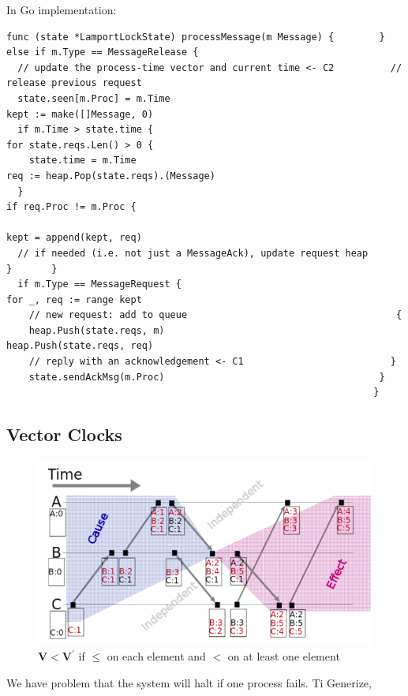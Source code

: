 \documentclass[acmlarge]{acmart}
\begin{document}
In Go implementation:

\begin{lstlisting}
func (state *LamportLockState) processMessage(m Message) {        } else if m.Type == MessageRelease {       
  // update the process-time vector and current time <- C2          // release previous request       
  state.seen[m.Proc] = m.Time                                       kept := make([]Message, 0)               
  if m.Time > state.time {                                          for state.reqs.Len() > 0 {             
    state.time = m.Time                                              req := heap.Pop(state.reqs).(Message)         
  }                                                                   if req.Proc != m.Proc {                           
                                                                      kept = append(kept, req) 
  // if needed (i.e. not just a MessageAck), update request heap      }       }      
  if m.Type == MessageRequest {                                     for _, req := range kept 
    // new request: add to queue                                     {                      
    heap.Push(state.reqs, m)                                          heap.Push(state.reqs, req)                   
    // reply with an acknowledgement <- C1                          }                                     
    state.sendAckMsg(m.Proc)                                      }
                                                                 }      
  \end{lstlisting}

\subsection{Vector Clocks}
\begin{figure}[h]
  \centering
  \includegraphics[width=\linewidth]{vec_lock.png}
  \caption{$\mathbf{V}<\mathbf{V}^{\prime}$ if $\leq$ on each element and $<$ on at least one element}
\end{figure}
We have problem that the system will halt if one process fails. Ti Generize, 
\end{document}
